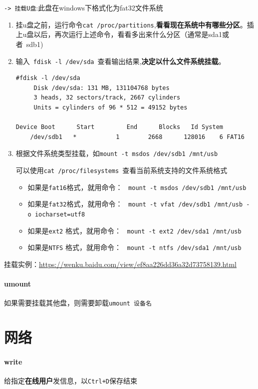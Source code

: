 \documentclass[UTF8,a4paper,12pt]{ctexbook}
\begin{document}
			\verb|-> 挂载U盘|:此盘在windows下格式化为fat32文件系统
				\begin{enumerate}
					\item 挂u盘之前，运行命令\verb|cat /proc/partitions|,\textbf{看看现在系统中有哪些分区}。插上u盘以后，再次运行上述命令，看看多出来什么分区（通常是sda1或者 sdb1)
					
					\item 输入 \verb|fdisk -l /dev/sda| 查看输出结果,\textbf{决定以什么文件系统挂载}。
					\begin{lstlisting}[frame=L,xleftmargin=.1\textwidth]
	#fdisk -l /dev/sda 
	 Disk /dev/sda: 131 MB, 131104768 bytes      
	 3 heads, 32 sectors/track, 2667 cylinders      
	 Units = cylinders of 96 * 512 = 49152 bytes 
	 Device Boot      Start         End      Blocks   Id System     
	/dev/sdb1   *           1        2668      128016    6 FAT16
					\end{lstlisting}
					
					\item 根据文件系统类型挂载，如\verb|mount -t msdos /dev/sdb1 /mnt/usb|
					
					可以使用\verb|cat /proc/filesystems |查看当前系统支持的文件系统格式
						\begin{itemize}
							\item 如果是\verb|fat16|格式，就用命令：  \verb|mount -t msdos /dev/sdb1 /mnt/usb| 
							\item 如果是\verb|fat32|格式，就用命令： 	\verb|mount -t vfat /dev/sdb1 /mnt/usb -o iocharset=utf8 |
							\item 如果是\verb|ext2| 格式，就用命令：  \verb|mount -t ext2 /dev/sda1 /mnt/usb|
							\item 如果是\verb|NTFS| 格式，就用命令：  \verb|mount -t ntfs /dev/sda1 /mnt/usb|
						\end{itemize}
				\end{enumerate}
				
				挂载实例：\url{https://wenku.baidu.com/view/ef8aa226dd36a32d73758139.html}
				
			\paragraph{umount} 如果需要挂载其他盘，则需要卸载\verb|umount 设备名|
			
	\section{网络}
			\paragraph{write} 给指定\textbf{在线用户}发信息，以\verb|Ctrl+D|保存结束
			
\end{document}
